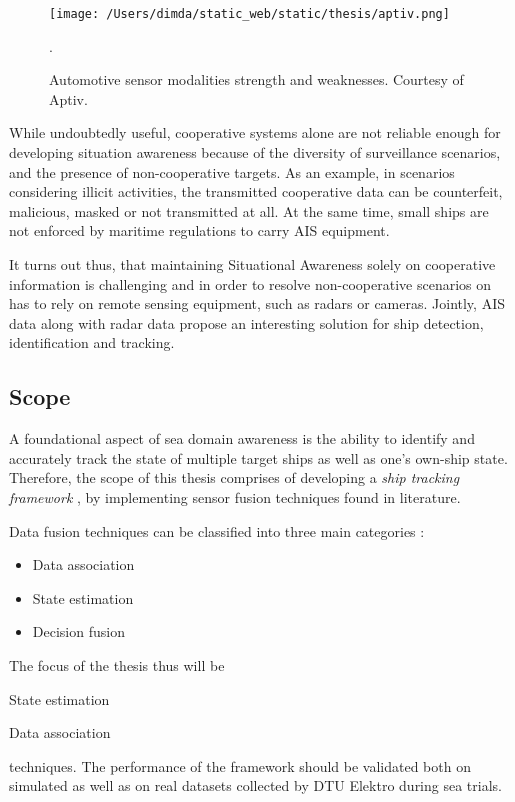 \begin{figure}[H]
	\centering
	\texttt{[image: /Users/dimda/static\_web/static/thesis/aptiv.png]}
	\caption{Automotive sensor modalities strength and weaknesses. Courtesy of Aptiv.}.
	\label{fig:taylor_approximation}
\end{figure}

While undoubtedly useful, cooperative systems alone are not reliable enough for developing situation awareness because of the diversity of surveillance scenarios, and the presence of non-cooperative targets. As an example, in scenarios considering illicit activities, the transmitted cooperative data can be counterfeit, malicious, masked or not transmitted at all. At the same time, small ships are not enforced by maritime regulations to carry AIS equipment. 

It turns out thus, that maintaining Situational Awareness solely on cooperative information is challenging and in order to resolve non-cooperative scenarios on has to rely on remote sensing equipment, such as radars or cameras. Jointly, AIS data along with radar data propose an interesting solution for ship detection, identification and tracking.


\subsection{Scope}


A foundational aspect of sea domain awareness is the ability to identify and accurately track the state of multiple target ships as well as one's own-ship state. Therefore, the scope of this thesis comprises of developing a \emph{ship tracking framework} , by implementing sensor fusion techniques found in literature.

Data fusion techniques can be classified into three main categories  \cite{nedo2013}:
\begin{itemize}
	\item Data association
	\item State estimation
	\item Decision fusion
\end{itemize}

 The focus of the thesis thus will be\begin{mylist}
	\item State estimation
	\item Data association
\end{mylist}
techniques. The performance of the framework should be validated both on simulated as well as on real datasets collected by DTU Elektro during sea trials.

